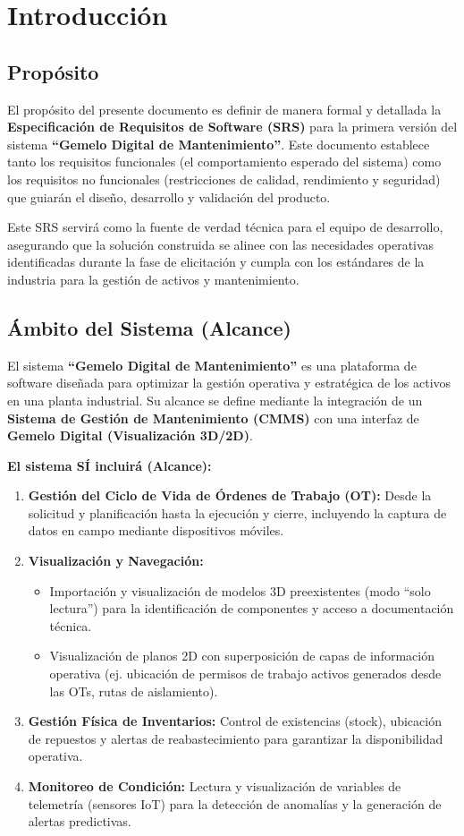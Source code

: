 \section{Introducción}

\subsection{Propósito}
El propósito del presente documento es definir de manera formal y detallada la \textbf{Especificación de Requisitos de Software (SRS)} para la primera versión del sistema \textbf{``Gemelo Digital de Mantenimiento''}. Este documento establece tanto los requisitos funcionales (el comportamiento esperado del sistema) como los requisitos no funcionales (restricciones de calidad, rendimiento y seguridad) que guiarán el diseño, desarrollo y validación del producto.

Este SRS servirá como la fuente de verdad técnica para el equipo de desarrollo, asegurando que la solución construida se alinee con las necesidades operativas identificadas durante la fase de elicitación y cumpla con los estándares de la industria para la gestión de activos y mantenimiento.

\subsection{Ámbito del Sistema (Alcance)}
El sistema \textbf{``Gemelo Digital de Mantenimiento''} es una plataforma de software diseñada para optimizar la gestión operativa y estratégica de los activos en una planta industrial. Su alcance se define mediante la integración de un \textbf{Sistema de Gestión de Mantenimiento (CMMS)} con una interfaz de \textbf{Gemelo Digital (Visualización 3D/2D)}.

\textbf{El sistema SÍ incluirá (Alcance):}
\begin{enumerate}
    \item \textbf{Gestión del Ciclo de Vida de Órdenes de Trabajo (OT):} Desde la solicitud y planificación hasta la ejecución y cierre, incluyendo la captura de datos en campo mediante dispositivos móviles.
    \item \textbf{Visualización y Navegación:}
    \begin{itemize}
        \item Importación y visualización de modelos 3D preexistentes (modo ``solo lectura'') para la identificación de componentes y acceso a documentación técnica.
        \item Visualización de planos 2D con superposición de capas de información operativa (ej. ubicación de permisos de trabajo activos generados desde las OTs, rutas de aislamiento).
    \end{itemize}
    \item \textbf{Gestión Física de Inventarios:} Control de existencias (stock), ubicación de repuestos y alertas de reabastecimiento para garantizar la disponibilidad operativa.
    \item \textbf{Monitoreo de Condición:} Lectura y visualización de variables de telemetría (sensores IoT) para la detección de anomalías y la generación de alertas predictivas.
\end{enumerate}

